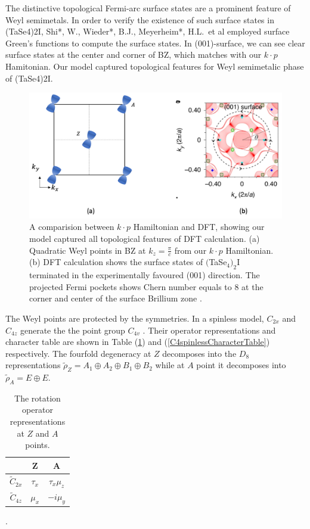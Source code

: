 The distinctive topological Fermi-arc surface states are a prominent feature of Weyl semimetals. In order to verify the existence of such surface states in (TaSe4)2I, Shi*, W., Wieder*, B.J., Meyerheim*, H.L. et al\cite{shi2021charge} employed surface Green's functions to compute the surface states. In (001)-surface, we can see clear surface states at the center and corner of BZ, which matches with our $k\cdot p$ Hamitonian. Our model captured  topological features for Weyl semimetalic phase of (TaSe4)2I.

\begin{figure}[h]
    \centering
    \includegraphics[width=\textwidth]{images/Weyl_points.png}
    \caption{A comparision between $k\cdot p$ Hamiltonian and DFT, showing our model captured all topological features of DFT calculation. (a) Quadratic Weyl points in BZ at $k_z=\frac{\pi}{c}$ from our $k\cdot p$ Hamiltonian. (b) DFT calculation shows the surface states of $($TaSe$_4)_2$I terminated in the experimentally favoured (001) direction. The projected Fermi pockets shows Chern number equals to 8 at the corner and center of the surface Brillium zone \cite{shi2021charge}.}
    \label{fig:weyl_points}
\end{figure}


The Weyl points are protected by the symmetries. In a spinless model, $C_{2x}$ and $C_{4z}$ generate the the point group $C_{4v}$ . Their operator representations and character table are shown in Table (\ref{C4vsymmTRIM}) and (\ref{C4spinlessCharacterTable}) respectively. The fourfold degeneracy at $Z$ decomposes into the $D_8$ representations $\tilde{\rho}_Z=A_1\oplus A_2\oplus B_1\oplus B_2\label{spinlessrepZ}$ while at $A$ point it decomposes into $\tilde{\rho}_A=E\oplus E$.

\begin{table}[h]
\begin{tabular}{c|cc}
&Z&A\\
\hline
$\tilde{C}_{2x}$&$\tau_x$&$\tau_x\mu_z$\\
$\tilde{C}_{4z}$&$\mu_x$&$-i\mu_y$
\end{tabular}.
\caption{The rotation operator representations at $Z$ and $A$ points.} \label{C4vsymmTRIM}
\end{table}

